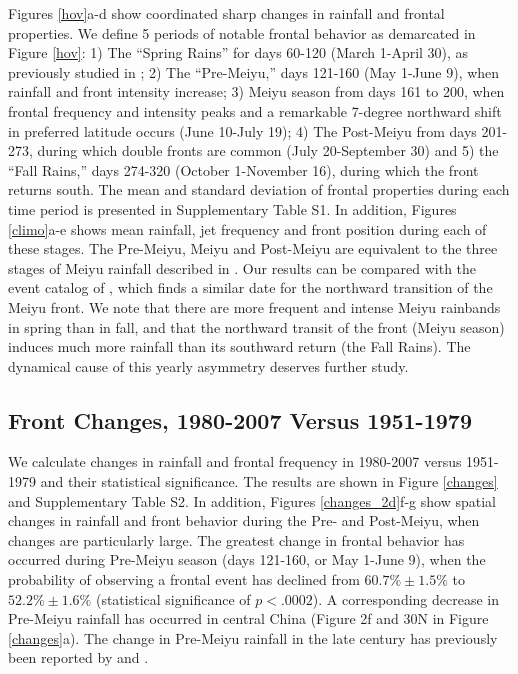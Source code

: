 \documentclass[draft,grl]{AGUTeX}
\begin{document}
\begin{article}
	Figures \ref{hov}a-d show coordinated sharp changes in rainfall and frontal properties. We define 5 periods of notable frontal behavior as demarcated in Figure \ref{hov}: 1) The ``Spring Rains'' for days 60-120 (March 1-April 30), as previously studied in \citet{Tian1998}; 2) The ``Pre-Meiyu,'' days 121-160 (May 1-June 9), when rainfall and front intensity increase; 3) Meiyu season from days 161 to 200, when frontal frequency and intensity peaks and a remarkable 7-degree northward shift in preferred latitude occurs (June 10-July 19); 4) The Post-Meiyu from days 201-273, during which double fronts are common (July 20-September 30) and 5) the ``Fall Rains,'' days 274-320 (October 1-November 16), during which the front returns south. The mean and standard deviation of frontal properties during each time period is presented in Supplementary Table S1. In addition, Figures \ref{climo}a-e shows mean rainfall, jet frequency and front position during each of these stages. The Pre-Meiyu, Meiyu and Post-Meiyu are equivalent to the three stages of Meiyu rainfall described in \citet{Ding2005}. Our results can be compared with the event catalog of \citet{Xu2009}, which finds a similar date for the northward transition of the Meiyu front. We note that there are more frequent and intense Meiyu rainbands in spring than in fall, and that the northward transit of the front (Meiyu season) induces much more rainfall than its southward return (the Fall Rains). The dynamical cause of this yearly asymmetry deserves further study.
		
\subsection{Front Changes, 1980-2007 Versus 1951-1979}
	
	We calculate changes in rainfall and frontal frequency in 1980-2007 versus 1951-1979 and their statistical significance. The results are shown in Figure \ref{changes} and Supplementary Table S2. In addition, Figures \ref{changes_2d}f-g show spatial changes in rainfall and front behavior during the Pre- and Post-Meiyu, when changes are particularly large. The greatest change in frontal behavior has occurred during Pre-Meiyu season (days 121-160, or May 1-June 9), when the probability of observing a frontal event has declined from $60.7\% \pm 1.5\%$ to $52.2\% \pm 1.6\%$ (statistical significance of $p < .0002$). A corresponding decrease in Pre-Meiyu rainfall has occurred in central China (Figure 2f and 30\textdegree N in Figure \ref{changes}a). The change in Pre-Meiyu rainfall in the late  century has previously been reported by \citet{Xin2006} and \citet{Wang2009}.
		

\end{article}
\end{document}
